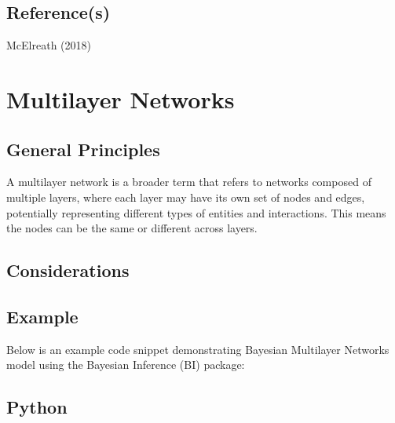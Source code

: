 \documentclass[
  letterpaper,
  DIV=11,
  numbers=noendperiod]{scrreprt}
\begin{document}
\section{Reference(s)}\label{references-18}

McElreath (2018)


\chapter{Multilayer Networks}\label{multilayer-networks}

\section{General Principles}\label{general-principles-20}

A multilayer network is a broader term that refers to networks composed
of multiple layers, where each layer may have its own set of nodes and
edges, potentially representing different types of entities and
interactions. This means the nodes can be the same or different across
layers.

\section{Considerations}\label{considerations-23}

\begin{tcolorbox}[enhanced jigsaw, toptitle=1mm, opacityback=0, titlerule=0mm, breakable, bottomrule=.15mm, colframe=quarto-callout-caution-color-frame, arc=.35mm, coltitle=black, left=2mm, opacitybacktitle=0.6, leftrule=.75mm, toprule=.15mm, rightrule=.15mm, bottomtitle=1mm, colbacktitle=quarto-callout-caution-color!10!white, title=\textcolor{quarto-callout-caution-color}{\faFire}\hspace{0.5em}{Caution}, colback=white]

\end{tcolorbox}

\section{Example}\label{example-22}

Below is an example code snippet demonstrating Bayesian Multilayer
Networks model using the Bayesian Inference (BI) package:

\section{Python}
\end{document}

